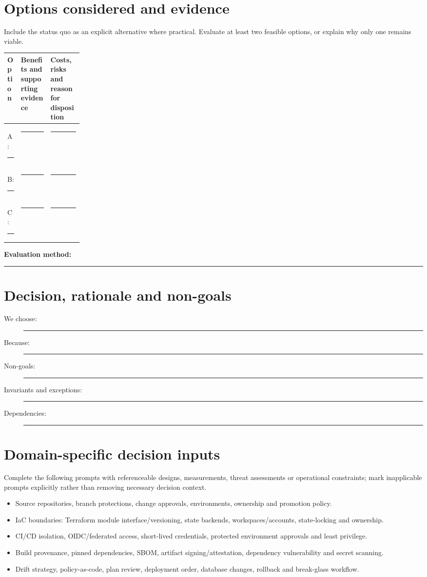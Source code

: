 \documentclass[11pt,letterpaper]{article}
\newcommand{\BlankResponse}{\rule[-0.4em]{0pt}{2em}\rule{0.65\linewidth}{0.4pt}}
\begin{document}
\section{Options considered and evidence}
Include the status quo as an explicit alternative where practical. Evaluate
at least two feasible options, or explain why only one remains viable.
\par\noindent\begin{tabularx}{\linewidth}{@{}>{\raggedright\arraybackslash}p{0.18\linewidth}>{\raggedright\arraybackslash}X >{\raggedright\arraybackslash}X@{}}
\toprule
\textbf{Option} & \textbf{Benefits and supporting evidence} & \textbf{Costs, risks and reason for disposition}\\
\midrule
A: \BlankResponse & \BlankResponse & \BlankResponse\\
B: \BlankResponse & \BlankResponse & \BlankResponse\\
C: \BlankResponse & \BlankResponse & \BlankResponse\\
\bottomrule
\end{tabularx}\par

\noindent\textbf{Evaluation method:} \BlankResponse

\section{Decision, rationale and non-goals}
\begin{description}
\item[We choose:] \BlankResponse
\item[Because:] \BlankResponse
\item[Non-goals:] \BlankResponse
\item[Invariants and exceptions:] \BlankResponse
\item[Dependencies:] \BlankResponse
\end{description}

\section{Domain-specific decision inputs}
Complete the following prompts with referenceable designs, measurements,
threat assessments or operational constraints; mark inapplicable prompts
explicitly rather than removing necessary decision context.
\begin{itemize}
\item Source repositories, branch protections, change approvals, environments, ownership and promotion policy.
\item IaC boundaries: Terraform module interface/versioning, state backends, workspaces/accounts, state-locking and ownership.
\item CI/CD isolation, OIDC/federated access, short-lived credentials, protected environment approvals and least privilege.
\item Build provenance, pinned dependencies, SBOM, artifact signing/attestation, dependency vulnerability and secret scanning.
\item Drift strategy, policy-as-code, plan review, deployment order, database changes, rollback and break-glass workflow.
\end{itemize}
\end{document}
